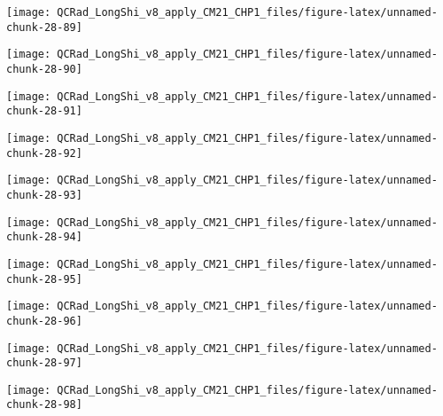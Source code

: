 \documentclass[
  10pt,
  a4paper,oneside]{article}
\begin{document}
\begin{center}\texttt{[image: QCRad\_LongShi\_v8\_apply\_CM21\_CHP1\_files/figure-latex/unnamed-chunk-28-89]} \end{center}

\begin{center}\texttt{[image: QCRad\_LongShi\_v8\_apply\_CM21\_CHP1\_files/figure-latex/unnamed-chunk-28-90]} \end{center}

\begin{center}\texttt{[image: QCRad\_LongShi\_v8\_apply\_CM21\_CHP1\_files/figure-latex/unnamed-chunk-28-91]} \end{center}

\begin{center}\texttt{[image: QCRad\_LongShi\_v8\_apply\_CM21\_CHP1\_files/figure-latex/unnamed-chunk-28-92]} \end{center}

\begin{center}\texttt{[image: QCRad\_LongShi\_v8\_apply\_CM21\_CHP1\_files/figure-latex/unnamed-chunk-28-93]} \end{center}

\begin{center}\texttt{[image: QCRad\_LongShi\_v8\_apply\_CM21\_CHP1\_files/figure-latex/unnamed-chunk-28-94]} \end{center}

\begin{center}\texttt{[image: QCRad\_LongShi\_v8\_apply\_CM21\_CHP1\_files/figure-latex/unnamed-chunk-28-95]} \end{center}

\begin{center}\texttt{[image: QCRad\_LongShi\_v8\_apply\_CM21\_CHP1\_files/figure-latex/unnamed-chunk-28-96]} \end{center}

\begin{center}\texttt{[image: QCRad\_LongShi\_v8\_apply\_CM21\_CHP1\_files/figure-latex/unnamed-chunk-28-97]} \end{center}

\begin{center}\texttt{[image: QCRad\_LongShi\_v8\_apply\_CM21\_CHP1\_files/figure-latex/unnamed-chunk-28-98]} \end{center}
\end{document}
